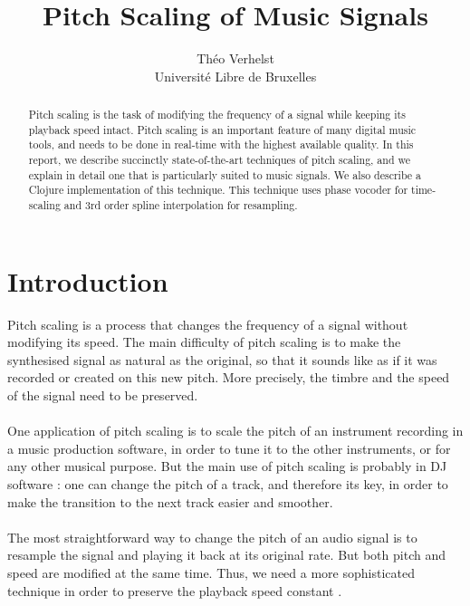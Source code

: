 \documentclass[letterpaper]{article}
\title{Pitch Scaling of Music Signals}
\author{Théo Verhelst \\ Université Libre de Bruxelles}
\theoremstyle{definition}
\theoremstyle{remark}
\theoremstyle{plain}
\begin{document}
\maketitle

\begin{abstract}
Pitch scaling is the task of modifying the frequency of a signal while keeping
its playback speed intact. Pitch scaling is an important feature of many digital
music tools, and needs to be done in real-time with the highest available
quality. In this report, we describe succinctly state-of-the-art techniques of
pitch scaling, and we explain in detail one that is particularly suited to music
signals. We also describe a Clojure implementation of this technique. This
technique uses phase vocoder for time-scaling and 3rd order spline interpolation
for resampling.
\end{abstract}

\section{Introduction}
Pitch scaling is a process that changes the frequency of a signal without
modifying its speed. The main difficulty of pitch scaling is to make the
synthesised signal as natural as the original, so that it sounds like as if it
was recorded or created on this new pitch. More precisely, the timbre and the
speed of the signal need to be preserved.

\paragraph{}
One application of pitch scaling is to scale the pitch of an instrument
recording in a music production software, in order to tune it to the other
instruments, or for any other musical purpose. But the main use of pitch scaling
is probably in DJ software \citep{Cliff00hangthe}: one can change the pitch of a
track, and therefore its key, in order to make the transition to the next track
easier and smoother.

\paragraph{}
The most straightforward way to change the pitch of an audio signal is to
resample the signal and playing it back at its original rate. But
both pitch and speed are modified at the same time. Thus, we need a more
sophisticated technique in order to preserve the playback speed constant
\citep{DM}.
\end{document}
